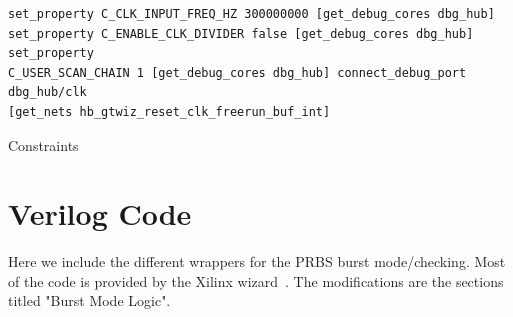 \documentclass[oneside]{discothesis}
\begin{document}
\begin{listing}
\begin{verbatim}
set_property C_CLK_INPUT_FREQ_HZ 300000000 [get_debug_cores dbg_hub]
set_property C_ENABLE_CLK_DIVIDER false [get_debug_cores dbg_hub] set_property
C_USER_SCAN_CHAIN 1 [get_debug_cores dbg_hub] connect_debug_port dbg_hub/clk
[get_nets hb_gtwiz_reset_clk_freerun_buf_int]
\end{verbatim}
\caption{Constraints}
\label{lst:constraints}
\end{listing}

\chapter{Verilog Code}%
\label{cha:verilog_code}
Here we include the different wrappers for the PRBS burst mode/checking. 
Most of the code is provided by the Xilinx wizard~\cite{wizard_guide}. The
modifications are the sections titled "Burst Mode Logic".
\end{document}
